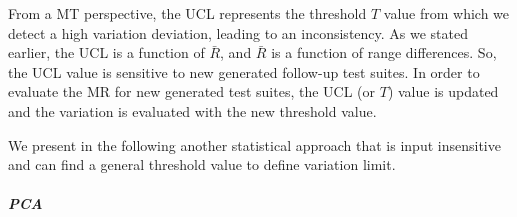 From a MT perspective, the UCL represents the threshold $T$ value from which we detect a high variation deviation, leading to an inconsistency. As we stated earlier, the UCL is a function of $\bar{R}$, and $\bar{R}$ is a function of range differences. So, the UCL value is sensitive to new generated follow-up test suites. In order to evaluate the MR for new generated test suites, the UCL (or $T$) value is updated and the variation is evaluated with the new threshold value. 

We present in the following another statistical approach that is input insensitive and can find a general threshold value to define variation limit.







\subparagraph{PCA}~\\ 

